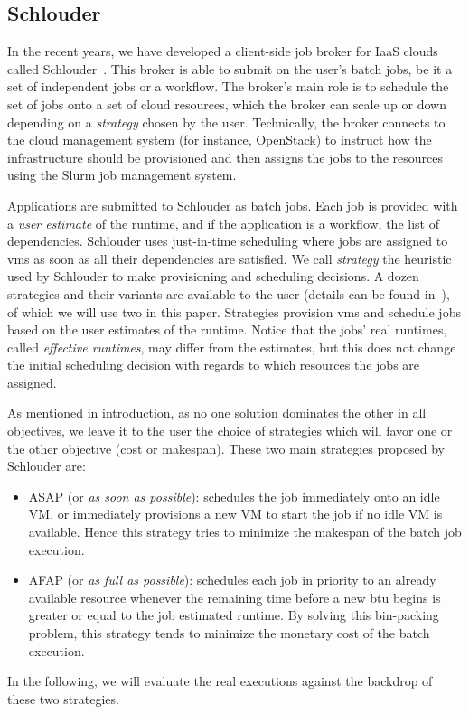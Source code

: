 \documentclass[10pt,conference,compsocconf]{IEEEtran}
\begin{document}
\subsection{Schlouder}
In the recent years, we have developed a client-side job broker for IaaS clouds
called Schlouder~\cite{Michon17}. This broker is able to submit on the user's 
 batch  jobs, be  it a  set of  independent jobs  or a  workflow.  The
broker's main role is to schedule the set of jobs onto a set of cloud resources,
which the broker can  scale up or down depending on  a \emph{strategy} chosen by
the user.  Technically, the broker connects  to the cloud management system (for
instance, OpenStack) to  instruct how the infrastructure  should be provisioned
and  then assigns  the jobs  to  the resources  using the  Slurm job  management
system. 

Applications are  submitted to Schlouder  as batch jobs. Each job  is provided
with  a  \emph{user estimate}  of  the  runtime, and  if  the  application is  a
workflow, the list of dependencies. Schlouder uses just-in-time scheduling where
jobs  are  assigned   to  \acp{vm}  as  soon  as  all   their  dependencies  are
satisfied.  We call  \emph{strategy} the  heuristic  used by  Schlouder to  make
provisioning and scheduling  decisions.  A dozen strategies and their variants are
available to  the user (details can  be found in~\cite{GenaudG11}), of  which we
will use  two in this  paper. Strategies  provision \acp{vm} and  schedule jobs
based on the user estimates of the runtime. Notice that the jobs' real runtimes,
called \emph{effective runtimes},  may differ from the estimates,  but this does
not change the initial scheduling decision with regards to which resources the 
jobs are assigned.

As mentioned in introduction, as no one solution dominates the other in all
objectives, we leave it to the user the choice of strategies which will favor 
one or the other objective (cost or makespan). These two main strategies 
proposed by Schlouder are:
\begin{itemize}
\item ASAP (or \textit{as soon as possible}): schedules the job immediately onto
  an idle VM, or immediately provisions a new VM to start the job if no idle VM 
  is available.  Hence this strategy tries to minimize the makespan
  of the batch job execution.

\item AFAP (or \textit{as full as  possible}): schedules each job in priority to
	an already available resource whenever the remaining time  before a new
	\ac{btu} begins is greater or equal to the job estimated runtime.
	By solving this bin-packing problem, this strategy tends to minimize the
	monetary cost of the batch execution.
\end{itemize}
In the following, we will evaluate the real executions against the backdrop of these two
strategies.
\end{document}
